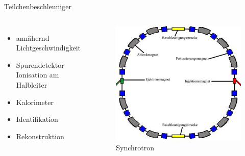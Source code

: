 \documentclass[aspectratio=169,xcolor=dvipsnames]{beamer}
\begin{document}
\begin{frame}{Teilchenbeschleuniger}
    \begin{columns}[c]
        \begin{itemize}
            \item annähernd Lichtgeschwindigkeit
            \item Spurendetektor Ionisation am Halbleiter
            \item Kalorimeter
            \item Identifikation
            \item Rekonstruktion

        \end{itemize}

        \begin{figure}
            \centering
            \includegraphics[width=1\linewidth]{figures/teilchenbe.jpg}
            \caption{Synchrotron}
            \label{fig:teilchenbe}
        \end{figure}
    \end{columns}
\end{frame}
\end{document}
